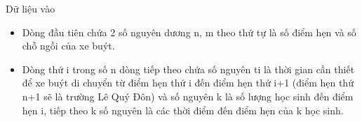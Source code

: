 Dữ liệu vào
\begin{itemize}
	\item     Dòng đầu tiên chứa 2 số nguyên dương n, m theo thứ tự là số điểm hẹn và số chỗ ngồi của xe buýt.   
	\item     Dòng thứ i trong số n dòng tiếp theo chứa số nguyên ti là thời gian cần thiết để xe buýt di chuyển từ điểm hẹn thứ i đến điểm hẹn thứ i+1 (điểm hẹn thứ n+1 sẽ là trường Lê Quý Đôn) và số nguyên k là số   lượng học sinh đến điểm hẹn i, tiếp theo k số nguyên là các thời điểm đến điểm hẹn của k học sinh.   
\end{itemize}